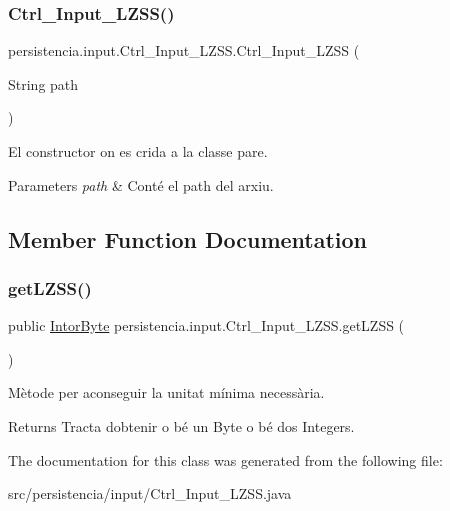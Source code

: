 \subsubsection{\texorpdfstring{Ctrl\+\_\+\+Input\+\_\+\+L\+Z\+S\+S()}{Ctrl\_Input\_LZSS()}}
{\footnotesize\ttfamily persistencia.\+input.\+Ctrl\+\_\+\+Input\+\_\+\+L\+Z\+S\+S.\+Ctrl\+\_\+\+Input\+\_\+\+L\+Z\+SS (\begin{DoxyParamCaption}\item[{String}]{path }\end{DoxyParamCaption})\hspace{0.3cm}{\ttfamily [inline]}}



El constructor on es crida a la classe pare. 


\begin{DoxyParams}{Parameters}
{\em path} & Conté el path del arxiu. \\
\hline
\end{DoxyParams}


\subsection{Member Function Documentation}
\mbox{\label{classpersistencia_1_1input_1_1Ctrl__Input__LZSS_a204d4d68a1d94725d9017b71bac0288e}} 
\subsubsection{\texorpdfstring{get\+L\+Z\+S\+S()}{getLZSS()}}
{\footnotesize\ttfamily public \hyperlink{classdomini_1_1utils_1_1IntorByte}{Intor\+Byte} persistencia.\+input.\+Ctrl\+\_\+\+Input\+\_\+\+L\+Z\+S\+S.\+get\+L\+Z\+SS (\begin{DoxyParamCaption}{ }\end{DoxyParamCaption})\hspace{0.3cm}{\ttfamily [inline]}}



Mètode per aconseguir la unitat mínima necessària. 

\begin{DoxyReturn}{Returns}
Tracta d\textquotesingle{}obtenir o bé un Byte o bé dos Integers. 
\end{DoxyReturn}


The documentation for this class was generated from the following file\+:\begin{DoxyCompactItemize}
\item 
src/persistencia/input/Ctrl\+\_\+\+Input\+\_\+\+L\+Z\+S\+S.\+java\end{DoxyCompactItemize}
